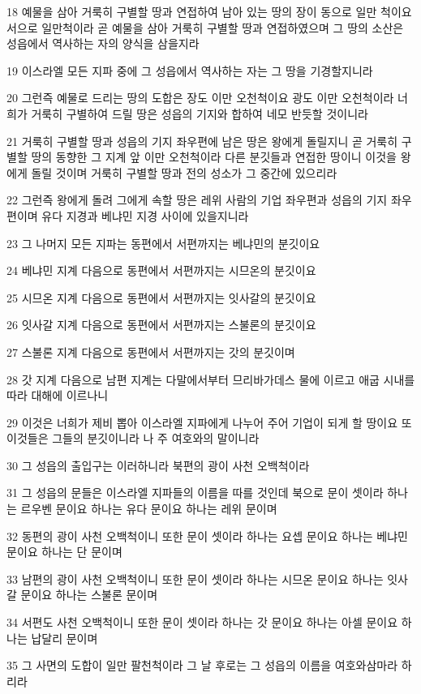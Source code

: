 \par 18 예물을 삼아 거룩히 구별할 땅과 연접하여 남아 있는 땅의 장이 동으로 일만 척이요 서으로 일만척이라 곧 예물을 삼아 거룩히 구별할 땅과 연접하였으며 그 땅의 소산은 성읍에서 역사하는 자의 양식을 삼을지라
\par 19 이스라엘 모든 지파 중에 그 성읍에서 역사하는 자는 그 땅을 기경할지니라
\par 20 그런즉 예물로 드리는 땅의 도합은 장도 이만 오천척이요 광도 이만 오천척이라 너희가 거룩히 구별하여 드릴 땅은 성읍의 기지와 합하여 네모 반듯할 것이니라
\par 21 거룩히 구별할 땅과 성읍의 기지 좌우편에 남은 땅은 왕에게 돌릴지니 곧 거룩히 구별할 땅의 동향한 그 지계 앞 이만 오천척이라 다른 분깃들과 연접한 땅이니 이것을 왕에게 돌릴 것이며 거룩히 구별할 땅과 전의 성소가 그 중간에 있으리라
\par 22 그런즉 왕에게 돌려 그에게 속할 땅은 레위 사람의 기업 좌우편과 성읍의 기지 좌우편이며 유다 지경과 베냐민 지경 사이에 있을지니라
\par 23 그 나머지 모든 지파는 동편에서 서편까지는 베냐민의 분깃이요
\par 24 베냐민 지계 다음으로 동편에서 서편까지는 시므온의 분깃이요
\par 25 시므온 지계 다음으로 동편에서 서편까지는 잇사갈의 분깃이요
\par 26 잇사갈 지계 다음으로 동편에서 서편까지는 스불론의 분깃이요
\par 27 스불론 지계 다음으로 동편에서 서편까지는 갓의 분깃이며
\par 28 갓 지계 다음으로 남편 지계는 다말에서부터 므리바가데스 물에 이르고 애굽 시내를 따라 대해에 이르나니
\par 29 이것은 너희가 제비 뽑아 이스라엘 지파에게 나누어 주어 기업이 되게 할 땅이요 또 이것들은 그들의 분깃이니라 나 주 여호와의 말이니라
\par 30 그 성읍의 출입구는 이러하니라 북편의 광이 사천 오백척이라
\par 31 그 성읍의 문들은 이스라엘 지파들의 이름을 따를 것인데 북으로 문이 셋이라 하나는 르우벤 문이요 하나는 유다 문이요 하나는 레위 문이며
\par 32 동편의 광이 사천 오백척이니 또한 문이 셋이라 하나는 요셉 문이요 하나는 베냐민 문이요 하나는 단 문이며
\par 33 남편의 광이 사천 오백척이니 또한 문이 셋이라 하나는 시므온 문이요 하나는 잇사갈 문이요 하나는 스불론 문이며
\par 34 서편도 사천 오백척이니 또한 문이 셋이라 하나는 갓 문이요 하나는 아셀 문이요 하나는 납달리 문이며
\par 35 그 사면의 도합이 일만 팔천척이라 그 날 후로는 그 성읍의 이름을 여호와삼마라 하리라


